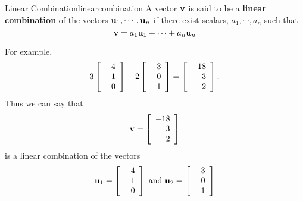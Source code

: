 \begin{definition}{Linear Combination}{linearcombination}
A vector ${\bf v}$ is said to be a \textbf{linear combination} of the vectors ${\bf u}_1,\cdots , {\bf u}_n $ 
if there exist scalars, $a_{1},\cdots ,a_{n}$ such
that
\begin{equation*}
{\bf v} = a_1 {\bf u}_1 + \cdots + a_n {\bf u}_n
\end{equation*}
\end{definition}

For example, 
\begin{equation*}
3
\left[
\begin{array}{r}
-4 \\
1 \\
0
\end{array}
\right]
+
2
\left[
\begin{array}{r}
-3 \\
0\\
1
\end{array}
\right]
 =
\left[
\begin{array}{r}
-18 \\
3 \\
2
\end{array}
\right]. 
\end{equation*}
Thus we can say that
\begin{equation*}
{\bf v}= \left[
\begin{array}{r}
-18 \\
3 \\
2
\end{array}
\right]
\end{equation*}
is a linear combination of the vectors 
\begin{equation*}
{\bf u}_1 = \left[
\begin{array}{r}
-4 \\
1 \\
0
\end{array}
\right]
\mbox{ and } 
{\bf u}_2 = 
\left[
\begin{array}{r}
-3 \\
0\\
1
\end{array}
\right]
\end{equation*}

